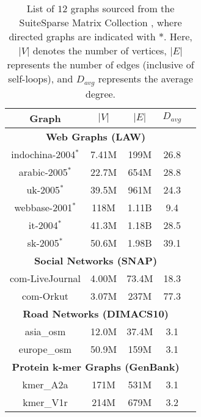 \begin{table}[hbtp]
  \centering
  \caption{List of $12$ graphs sourced from the SuiteSparse Matrix Collection \cite{suite19}, where directed graphs are indicated with $*$. Here, $|V|$ denotes the number of vertices, $|E|$ represents the number of edges (inclusive of self-loops), and $D_{avg}$ represents the average degree.}
  \label{tab:dataset-large}
  \begin{tabular}{|c||c|c|c|c|}
    \toprule
    \textbf{Graph} &
    \textbf{\textbf{$|V|$}} &
    \textbf{\textbf{$|E|$}} &
    \textbf{\textbf{$D_{avg}$}} \\
    \midrule
    \multicolumn{4}{|c|}{\textbf{Web Graphs (LAW)}} \\ \hline
    indochina-2004$^*$ & 7.41M & 199M & 26.8 \\ \hline  %
    arabic-2005$^*$ & 22.7M & 654M & 28.8 \\ \hline  %
    uk-2005$^*$ & 39.5M & 961M & 24.3 \\ \hline  %
    webbase-2001$^*$ & 118M & 1.11B & 9.4 \\ \hline  %
    it-2004$^*$ & 41.3M & 1.18B & 28.5 \\ \hline  %
    sk-2005$^*$ & 50.6M & 1.98B & 39.1 \\ \hline  %
    \multicolumn{4}{|c|}{\textbf{Social Networks (SNAP)}} \\ \hline
    com-LiveJournal & 4.00M & 73.4M & 18.3 \\ \hline  %
    com-Orkut & 3.07M & 237M & 77.3 \\ \hline  %
    \multicolumn{4}{|c|}{\textbf{Road Networks (DIMACS10)}} \\ \hline
    asia\_osm & 12.0M & 37.4M & 3.1 \\ \hline  %
    europe\_osm & 50.9M & 159M & 3.1 \\ \hline  %
    \multicolumn{4}{|c|}{\textbf{Protein k-mer Graphs (GenBank)}} \\ \hline
    kmer\_A2a & 171M & 531M & 3.1 \\ \hline  %
    kmer\_V1r & 214M & 679M & 3.2 \\ \hline  %
  \bottomrule
  \end{tabular}
\end{table}
